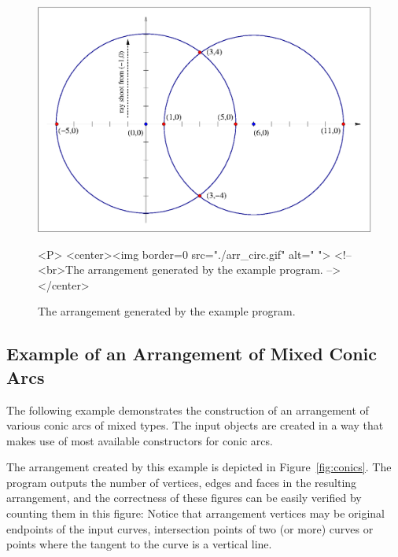\begin{itemize}
\begin{figure}[h]
\begin{ccTexOnly}
{\centerline {\includegraphics{Arrangement_2/arr_circ.ps}}}
\end{ccTexOnly}
\caption{The arrangement generated by the example program.\label{fig:circles}}
\begin{ccHtmlOnly}
<P>
<center><img border=0 src="./arr_circ.gif" alt=" ">
<!-- <br>The arrangement generated by the example program. -->
</center>
\end{ccHtmlOnly}
\end{figure}


\subsection{Example of an Arrangement of Mixed Conic Arcs}
\label{ssec:example13}

The following example demonstrates the construction of an arrangement
of various conic arcs of mixed types. The input  objects are
created in a way that makes use of most available constructors for conic
arcs.

The arrangement created by this example is depicted in 
Figure~\ref{fig:conics}. The program outputs the number of vertices, edges and
faces in the resulting arrangement, and the correctness of these figures can
be easily verified by counting them in this figure: Notice that arrangement
vertices may be original endpoints of the input curves, intersection points
of two (or more) curves or points where the tangent to the curve is a vertical
line.


\end{itemize}
